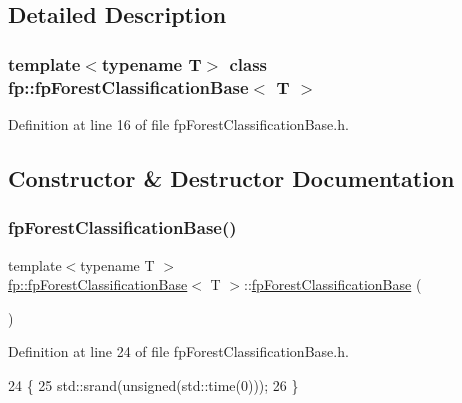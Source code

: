 \subsection{Detailed Description}
\subsubsection*{template$<$typename T$>$\newline
class fp\+::fp\+Forest\+Classification\+Base$<$ T $>$}



Definition at line 16 of file fp\+Forest\+Classification\+Base.\+h.



\subsection{Constructor \& Destructor Documentation}
\mbox{\label{classfp_1_1fpForestClassificationBase_a788f11473d1b7c86928d021617a92f2a}} 
\subsubsection{\texorpdfstring{fp\+Forest\+Classification\+Base()}{fpForestClassificationBase()}}
{\footnotesize\ttfamily template$<$typename T $>$ \\
\hyperlink{classfp_1_1fpForestClassificationBase}{fp\+::fp\+Forest\+Classification\+Base}$<$ T $>$\+::\hyperlink{classfp_1_1fpForestClassificationBase}{fp\+Forest\+Classification\+Base} (\begin{DoxyParamCaption}{ }\end{DoxyParamCaption})\hspace{0.3cm}{\ttfamily [inline]}}



Definition at line 24 of file fp\+Forest\+Classification\+Base.\+h.


\begin{DoxyCode}
24                                         \{
25                 std::srand(\textcolor{keywordtype}{unsigned}(std::time(0)));
26             \}
\end{DoxyCode}


